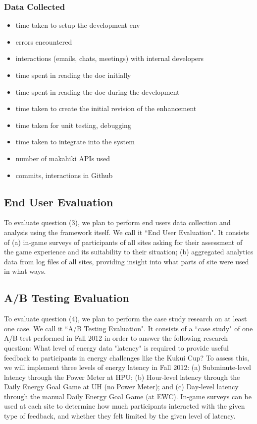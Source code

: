 \documentclass[11pt]{article}
\begin{document}
\subsubsection{Data Collected}
\begin{itemize}
 \item time taken to setup the development env
 \item errors encountered
 \item interactions (emails, chats, meetings) with internal developers
 \item time spent in reading the doc initially
 \item time spent in reading the doc during the development
 \item time taken to create the initial revision of the enhancement
 \item time taken for unit testing, debugging
 \item time taken to integrate into the system
 \item number of makahiki APIs used
 \item commits, interactions in Github
 
\end{itemize}

\subsection{End User Evaluation}
To evaluate question (3), we plan to perform end users data collection and analysis using the framework itself. We call it ``End User Evaluation". It consists of (a) in-game surveys of participants of all sites asking for their assessment of the game experience and its suitability to their situation;
(b) aggregated analytics data from log files of all sites, providing insight into what parts of site were used in what ways.

\subsection{A/B Testing Evaluation}
To evaluate question (4), we plan to perform the case study research on at least one case. We call it ``A/B Testing Evaluation". It consists of a ``case study" of one A/B test performed in Fall 2012 in order to answer the following research question: What level of energy data "latency" is required to provide useful feedback to participants in energy challenges like the Kukui Cup?  To assess this, we will implement three levels of energy latency in Fall 2012:  (a) Subminute-level latency through the Power Meter at HPU; (b) Hour-level latency through the Daily Energy Goal Game at UH (no Power Meter); and (c) Day-level latency through the manual Daily Energy Goal Game (at EWC).  In-game surveys can be used at each site to determine how much participants interacted with the given type of feedback, and whether they felt limited by the given level of latency.
  
\end{document}
